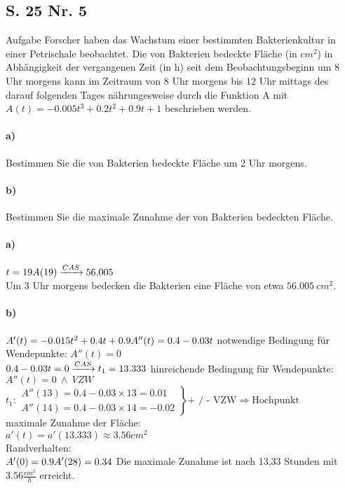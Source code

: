 \documentclass[arbeitsmappe.tex]{subfiles}
\begin{document}
    \subsection{S. 25 Nr. 5}
    \begin{rblock}{Aufgabe}
        Forscher haben das Wachstum einer bestimmten Bakterienkultur in einer Petrischale beobachtet.
        Die von Bakterien bedeckte Fläche (in $cm^2$) in Abhängigkeit der vergangenen Zeit (in h) seit
        dem Beobachtungsbeginn um 8 Uhr morgens kann im Zeitraum von 8 Uhr morgens bis 12 Uhr mittags des
        darauf folgenden Tages nährungesweise durch die Funktion A mit $A(t) = -0.005t^3+0.2t^2+0.9t+1$
        beschrieben werden.

        \paragraph{a)} Bestimmen Sie die von Bakterien bedeckte Fläche um 2 Uhr morgens.

        \paragraph{b)} Bestimmen Sie die maximale Zunahme der von Bakterien bedeckten Fläche.
    \end{rblock}

    \paragraph{a)}
    $
    t = 19 \\
    A(19) \xrightarrow{CAS} 56.005
    $ \\
    Um 3 Uhr morgens bedecken die Bakterien eine Fläche von etwa $56.005\ cm^2$.

    \paragraph{b)}
    $
    A'(t) = -0.015t^2 + 0.4t + 0.9 \\
    A''(t) = 0.4 - 0.03t \\
    $
    notwendige Bedingung für Wendepunkte: $A''(t) = 0$ \\
    $
    0.4 - 0.03t = 0 \\
    \xrightarrow{CAS} t_1 = 13.333 \\
    $
    hinreichende Bedingung für Wendepunkte: $A''(t) = 0\ \land\ VZW$ \\
    $
    \left.
        t_1:
        \begin{array}{l}
            A''(13) = 0.4 - 0.03 \times 13 = 0.01 \\
            A''(14) = 0.4 - 0.03 \times 14 = -0.02
        \end{array}
    \right\} \text{+ / - VZW} \Rightarrow \text{Hochpunkt}
    $
    \\
    maximale Zunahme der Fläche: \\
    $
    a'(t) = a'(13.333) \approx 3.56cm^2
    $
    \\
    Randverhalten:
    \\
    $
    A'(0) = 0.9 \\
    A'(28) = 0.34 \\
    $
    Die maximale Zunahme ist nach 13,33 Stunden mit $3.56 \frac{cm^2}{h}$ erreicht.
\end{document}
